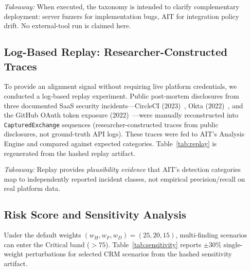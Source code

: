 \documentclass[conference]{IEEEtran}
\begin{document}
\begin{table}[htbp]
  \caption{Tool Capability Comparison (selected artifact or
  \texttt{NOT RUN})}
  \label{tab:comparison}
  \centering
  \renewcommand{\arraystretch}{1.25}
  
\end{table}

\noindent\textit{Takeaway:} When executed, the taxonomy is intended to
clarify complementary deployment: server fuzzers for implementation bugs,
AIT for integration policy drift. No external-tool run is claimed here.

\subsection{Log-Based Replay: Researcher-Constructed Traces}
\label{sec:replay}

To provide an alignment signal without requiring live
platform credentials, we conducted a log-based replay experiment.
Public post-mortem disclosures from three documented SaaS security
incidents---CircleCI (2023)~\cite{circleci2023},
Okta (2022)~\cite{okta2022}, and the GitHub OAuth token
exposure (2022)~\cite{github2022}---were manually reconstructed into
\texttt{CapturedExchange} sequences (researcher-constructed traces from
public disclosures, not ground-truth API logs). These traces were fed
to AIT's Analysis Engine and compared against expected categories.
Table~\ref{tab:replay} is regenerated from the hashed replay artifact.

\begin{table}[htbp]
  \caption{Log-Based Replay: Expected vs.\ Observed Categories
  (researcher-constructed traces)}
  \label{tab:replay}
  \centering
  \renewcommand{\arraystretch}{1.25}
  \footnotesize
  \resizebox{\textwidth}{!}{}
\end{table}

\noindent\textit{Takeaway:} Replay provides \emph{plausibility evidence}
that AIT's detection categories map to independently reported incident
classes, not empirical precision/recall on real platform data.

\subsection{Risk Score and Sensitivity Analysis}

Under the default weights $(w_H,w_F,w_D)=(25,20,15)$, multi-finding
scenarios can enter the Critical band ($>75$). Table~\ref{tab:sensitivity}
reports $\pm30\%$ single-weight perturbations for selected CRM scenarios
from the hashed sensitivity artifact.
\end{document}
